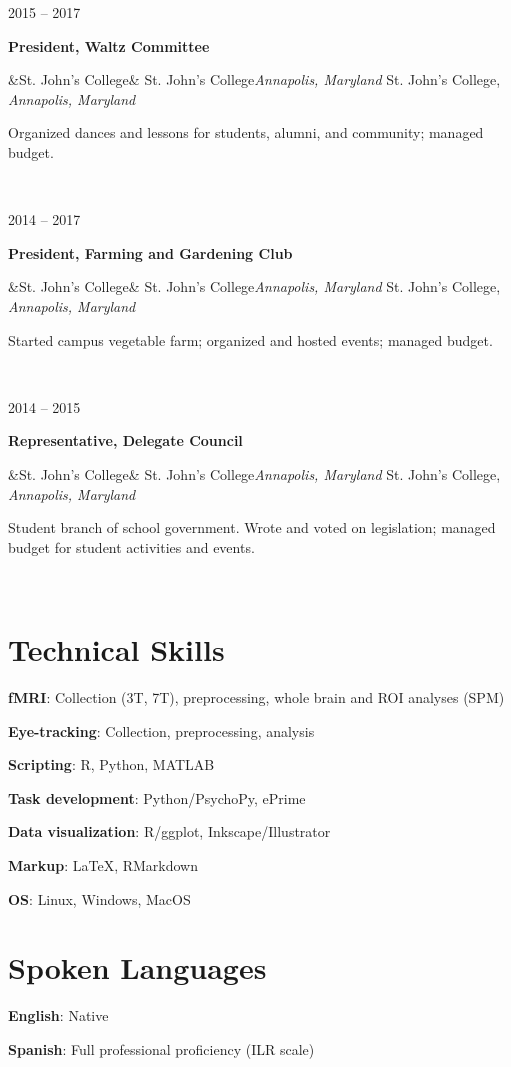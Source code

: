 \documentclass{article}
\newcommand{\entry}[5]{

  \begin{minipage}[t]{.15\textwidth}
    \begin{flushright}
      \hfill {#1}
    \end{flushright}
  \end{minipage}
  \hfill\vline\hfill
  \begin{minipage}[t]{.80\textwidth}
    \textbf{#2}

    \ifx&#3&
      {#3}\textit{#4}
    \else
      {#3, }\textit{#4}

    \fi
    \footnotesize{#5}
  \end{minipage}\\\vspace{.25cm}
}
\newcommand{\skillentry}[2]{
  {\hspace{2em}\textbf{#1}:}
  {#2}
  \vspace{.25cm}
}
\newcommand{\sjc}{St. John's College}
\begin{document}
\entry{2015 -- 2017}{President, Waltz Committee}
{\sjc}{Annapolis, Maryland}
{Organized dances and lessons for students, alumni, and community; managed budget.}

\entry{2014 -- 2017}{President, Farming and Gardening Club}
{\sjc}{Annapolis, Maryland}
{Started campus vegetable farm; organized and hosted events; managed budget.}

\entry{2014 -- 2015}{Representative, Delegate Council}
{\sjc}{Annapolis, Maryland}
{Student branch of school government. Wrote and voted on legislation; managed budget for student activities and events.}

\section{Technical Skills}

\skillentry{fMRI}
{Collection (3T, 7T), preprocessing, whole brain and ROI analyses (SPM)}

\skillentry{Eye-tracking}{Collection, preprocessing, analysis}

\skillentry{Scripting}{R, Python, MATLAB}

\skillentry{Task development}
{Python/PsychoPy, ePrime}

\skillentry{Data visualization}{R/ggplot, Inkscape/Illustrator}

\skillentry{Markup}{\LaTeX, RMarkdown}

\skillentry{OS}{Linux, Windows, MacOS}

\section{Spoken Languages}
\skillentry{English}{Native}

\skillentry{Spanish}{Full professional proficiency (ILR scale)}
\end{document}
